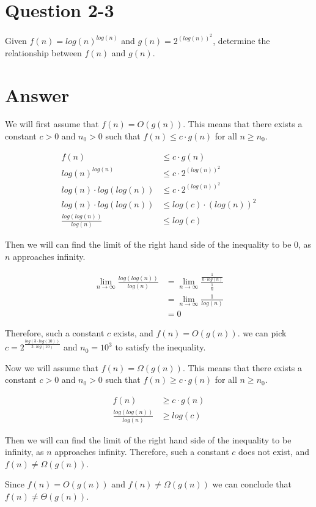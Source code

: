 \documentclass{article}
\begin{document}
\section{Question 2-3}
Given $f(n) = log(n)^{log(n)}$ and $g(n) = 2^{(log(n))^2}$, determine the relationship between $f(n)$ and $g(n)$.

\section{Answer}
We will first assume that $f(n) = O(g(n))$. This means that there exists a constant $c > 0$ and $n_0 > 0$ such that $f(n) \leq c \cdot g(n)$ for all $n \geq n_0$.

\begin{align*}
f(n) &\leq c \cdot g(n) \\
log(n)^{log(n)} &\leq c \cdot 2^{(log(n))^2} \\
log(n) \cdot log(log(n)) &\leq c \cdot 2^{(log(n))^2} \\
log(n)\cdot log(log(n)) &\leq log(c)\cdot (log(n))^2 \\
\frac{log(log(n))}{log(n)} &\leq log (c)
\end{align*}

Then we will can find the limit of the right hand side of the inequality to be 0, as $n$ approaches infinity.

\begin{align*}
\lim_{n \to \infty} \frac{log(log(n))}{log(n)} &= \lim_{n \to \infty} \frac{\frac{1}{n\cdot log(n)}}{\frac{1}{n}} \tag{L'Hopital}\\
&= \lim_{n \to \infty} \frac{1}{log(n)} \\
&= 0
\end{align*}

Therefore, such a constant $c$ exists, and $f(n) = O(g(n))$.
we can pick $c = 2^{\frac{log(3\cdot log(10))}{3\cdot log(10)}}$ and $n_0 = 10^3$ to satisfy the inequality.


Now we will assume that $f(n) = \Omega(g(n))$. This means that there exists a constant $c > 0$ and $n_0 > 0$ such that $f(n) \geq c \cdot g(n)$ for all $n \geq n_0$.

\begin{align*}
f(n) &\geq c \cdot g(n) \\
\frac{log(log(n))}{log(n)} &\geq log (c)
\end{align*}

Then we will can find the limit of the right hand side of the inequality to be infinity, as $n$ approaches infinity.
Therefore, such a constant $c$ does not exist, and $f(n) \ne \Omega(g(n))$.

Since $f(n) = O(g(n))$ and $f(n) \ne \Omega(g(n))$ we can conclude that $f(n) \ne \Theta(g(n))$.
\end{document}
